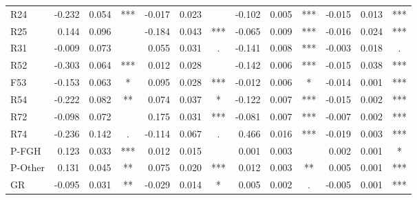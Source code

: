 \documentclass[11pt,letterpaper]{article}
\numberwithin{equation}{section}
\numberwithin{equation}{section}
\numberwithin{equation}{section}
\begin{document}
\begin{center}
\begin{table}
\begin{tabular}{|l|rrc|rrc|rrc|rrc|}
R24       & -0.232 & 0.054 & *** & -0.017 & 0.023 &     & -0.102 & 0.005 & *** & -0.015 & 0.013 & *** \\
R25       & 0.144  & 0.096 &     & -0.184 & 0.043 & *** & -0.065 & 0.009 & *** & -0.016 & 0.024 & *** \\
R31       & -0.009 & 0.073 &     & 0.055  & 0.031 & .   & -0.141 & 0.008 & *** & -0.003 & 0.018 & .   \\
R52       & -0.303 & 0.064 & *** & 0.012   & 0.028 &     & -0.142 & 0.006  & *** & -0.015 & 0.038 & *** \\
F53       & -0.153 & 0.063 & *   & 0.095  & 0.028 & *** & -0.012 & 0.006  & *   & -0.014 & 0.001 & *** \\
R54       & -0.222 & 0.082 & **  & 0.074  & 0.037 & *   & -0.122 & 0.007 & *** & -0.015  & 0.002 & *** \\
R72       & -0.098 & 0.072 &     & 0.175  & 0.031 & *** & -0.081 & 0.007 & *** & -0.007 & 0.002 & *** \\
R74       & -0.236 & 0.142 & .   & -0.114 & 0.067 & .   & 0.466  & 0.016 & *** & -0.019 & 0.003 & *** \\
P-FGH     & 0.123 & 0.033 & *** & 0.012 & 0.015 &     & 0.001    & 0.003 &     & 0.002  & 0.001 & *   \\
P-Other   & 0.131  & 0.045 & **  & 0.075   & 0.020 & *** & 0.012  & 0.003 & **  & 0.005  & 0.001  & *** \\
GR        & -0.095 & 0.031 & **  & -0.029 & 0.014 & *   & 0.005   & 0.002 & .   & -0.005 & 0.001 & *** \\
\hline\hline
\end{tabular}
\end{table}


\end{center}
\end{document}
